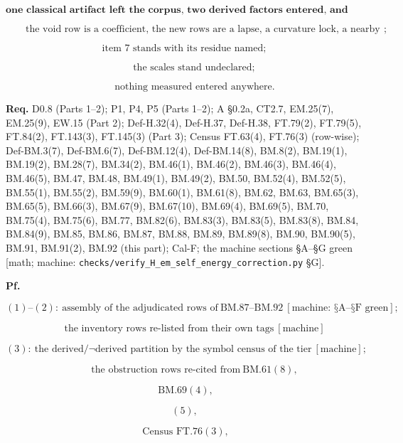 \documentclass[11pt,openany]{report}
\theoremstyle{canonplain}
\theoremstyle{canondef}
\begin{document}
\[
\textbf{one classical artifact left the corpus, two derived factors entered, and nothing was fitted:}
\]

\[
\qquad \text{the void row is a coefficient, the new rows are a lapse, a curvature lock, a nearby fraction and a crystallization weight};
\]

\[
\text{item 7 stands with its residue named};
\]

\[
\qquad \text{the scales stand undeclared};
\]

\[
\qquad \text{nothing measured entered anywhere}.
\]

\textbf{Req.} D0.8 (Parts 1–2); P1, P4, P5 (Parts 1–2); A §0.2a, CT2.7, EM.25(7), EM.25(9), EW.15 (Part 2); Def-H.32(4), Def-H.37, Def-H.38, FT.79(2), FT.79(5), FT.84(2), FT.143(3), FT.145(3) (Part 3); Census FT.63(4), FT.76(3) (row-wise); Def-BM.3(7), Def-BM.6(7), Def-BM.12(4), Def-BM.14(8), BM.8(2), BM.19(1), BM.19(2), BM.28(7), BM.34(2), BM.46(1), BM.46(2), BM.46(3), BM.46(4), BM.46(5), BM.47, BM.48, BM.49(1), BM.49(2), BM.50, BM.52(4), BM.52(5), BM.55(1), BM.55(2), BM.59(9), BM.60(1), BM.61(8), BM.62, BM.63, BM.65(3), BM.65(5), BM.66(3), BM.67(9), BM.67(10), BM.69(4), BM.69(5), BM.70, BM.75(4), BM.75(6), BM.77, BM.82(6), BM.83(3), BM.83(5), BM.83(8), BM.84, BM.84(9), BM.85, BM.86, BM.87, BM.88, BM.89, BM.89(8), BM.90, BM.90(5), BM.91, BM.91(2), BM.92 (this part); Cal-F; the machine sections §A–§G green [math; machine: \texttt{checks/\allowbreak{}verify\_\allowbreak{}H\_\allowbreak{}em\_\allowbreak{}self\_\allowbreak{}energy\_\allowbreak{}correction.py} §G].

\textbf{Pf.}

\[
(1)\text{--}(2):\ \text{assembly of the adjudicated rows of}\ \mathrm{BM.87}\text{--}\mathrm{BM.92}\ [\text{machine: §A--§F green}];
\]

\[
\qquad \text{the inventory rows re-listed from their own tags}\ [\text{machine}]
\]

\[
(3):\ \text{the derived/}\neg\text{derived partition by the symbol census of the tier}\ [\text{machine}];
\]

\[
\qquad \text{the obstruction rows re-cited from}\ \mathrm{BM.61}(8),
\]

\[
\ \mathrm{BM.69}(4),
\]

\[
(5),
\]

\[
\ \text{Census FT.76}(3),
\]
\end{document}
